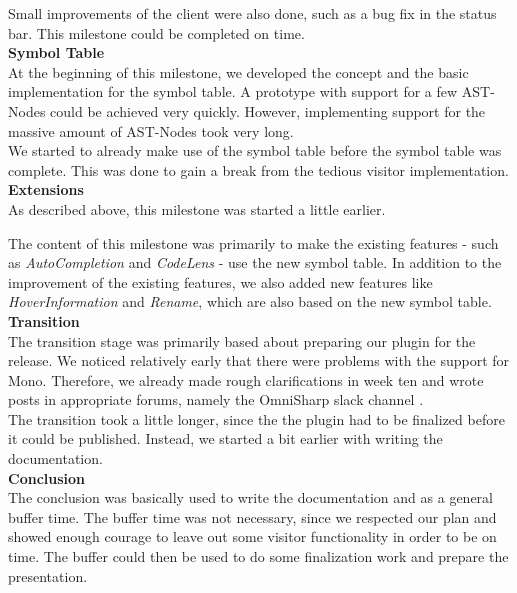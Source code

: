 Small improvements of the client were also done, such as a bug fix in the status bar.
This milestone could be completed on time.\\

{\bf Symbol Table}\\
At the beginning of this milestone,
we developed the concept and the basic implementation for the symbol table.
A prototype with support for a few AST-Nodes could be achieved very quickly.
However, implementing support for the massive amount of AST-Nodes took very long.\\

We started to already make use of the symbol table before the symbol table was complete.
This was done to gain a break from the tedious visitor implementation.\\

{\bf Extensions}\\
As described above, this milestone was started a little earlier.

The content of this milestone was primarily to make the existing features
- such as \textit{AutoCompletion} and \textit{CodeLens} -
use the new symbol table.
In addition to the improvement of the existing features, we also
added new features like \textit{HoverInformation} and \textit{Rename},
which are also based on the new symbol table.\\

{\bf Transition}\\
The transition stage was primarily based about preparing our plugin for the release.
We noticed relatively early that there were problems with the support for Mono.
Therefore, we already made rough clarifications in week ten and wrote posts in appropriate forums,
namely the OmniSharp slack channel \cite{mono-slack}.\\

The transition took a little longer, since the the plugin had to be finalized before it could be published.
Instead, we started a bit earlier with writing the documentation.\\

{\bf Conclusion}\\
The conclusion was basically used to write the documentation and as a general buffer time.
The buffer time was not necessary, since we respected our plan and showed enough courage to leave out some visitor functionality in order to be on time.
The buffer could then be used to do some finalization work and prepare the presentation.

